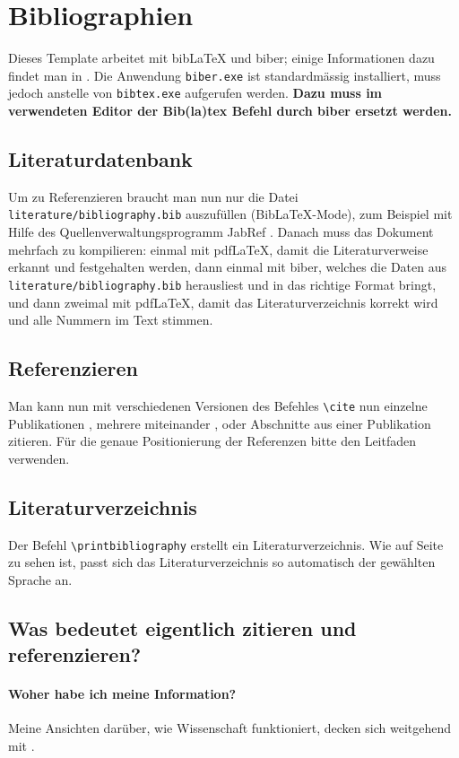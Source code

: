 \section{Bibliographien}
Dieses Template arbeitet mit bibLaTeX und biber; einige Informationen dazu findet man in \cite{biblatex_biber}. Die Anwendung \texttt{biber.exe} ist standardmässig installiert, muss jedoch anstelle von \texttt{bibtex.exe} aufgerufen werden. \textbf{Dazu muss im verwendeten Editor der Bib(la)tex Befehl durch biber ersetzt werden.} 

\subsection{Literaturdatenbank}
Um zu Referenzieren braucht man nun nur die Datei \verb|literature/bibliography.bib| auszufüllen (BibLaTeX-Mode), zum Beispiel mit Hilfe des Quellenverwaltungsprogramm JabRef \cite{jabref}. Danach muss das Dokument mehrfach zu kompilieren: einmal mit pdfLaTeX, damit die Literaturverweise erkannt und festgehalten werden, dann einmal mit biber, welches die Daten aus \verb|literature/bibliography.bib| herausliest und in das richtige Format bringt, und dann zweimal mit pdfLaTeX, damit das Literaturverzeichnis korrekt wird und alle Nummern im Text stimmen.

\subsection{Referenzieren}
Man kann nun mit verschiedenen Versionen des Befehles \verb|\cite| nun einzelne Publikationen \cite{Mason1953}, mehrere miteinander \cite{Mason1953,Mason1956}, oder Abschnitte aus einer Publikation \cite[Sec.~4]{Schmid2018} zitieren.
Für die genaue Positionierung der Referenzen bitte den Leitfaden verwenden.

\subsection{Literaturverzeichnis}
Der Befehl \verb|\printbibliography| erstellt ein Literaturverzeichnis.
Wie auf Seite~\pageref{sec:lit} zu sehen ist, passt sich das Literaturverzeichnis so automatisch der gewählten Sprache an.

\subsection{Was bedeutet eigentlich zitieren und referenzieren?}

\paragraph{Woher habe ich meine Information?}
Meine Ansichten darüber, wie Wissenschaft funktioniert, decken sich weitgehend mit \cite{Schmid2003}.

